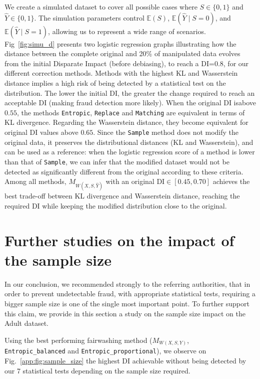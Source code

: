 \documentclass[runningheads, orivec]{llncs}
\begin{document}
 

We create a simulated dataset to cover all possible cases where $ S \in \{0,1\}$ and $\widehat{Y} \in \{0,1\}$. The simulation parameters control $ \mathbb{E}(S)$, $ \mathbb{E}(\widehat{Y} \mid S = 0)$, and $\mathbb{E}(\widehat{Y} \mid S = 1)$, allowing us to represent a wide range of scenarios.
Fig~\ref{fig:simu_d} presents two logistic regression graphs illustrating how the distance between the complete original and 20\% of manipulated data evolves from the initial Disparate Impact (before debiasing), to reach a DI=0.8, for our different correction methods.
Methods with the highest KL and Wasserstein distance implies a high risk of being detected by a statistical test on the distribution. The lower the initial DI, the greater the change required to reach an acceptable DI (making fraud detection more likely).
When the original DI isabove $0.55$, the methods \texttt{Entropic}, \texttt{Replace} and \texttt{Matching} are equivalent in terms of KL divergence. Regarding the Wasserstein distance, they become equivalent for original DI values above $0.65$. Since the \texttt{Sample} method does not modify the original data, it preserves the distributional distances (KL and Wasserstein), and can be used as a reference: when the logistic regression score of a method is lower than that of \texttt{Sample}, we can infer that the modified dataset would not be detected as significantly different from the original according to these criteria. Among all methods, $M_{W(X,S,\widehat{Y})}$ with an original DI$\in[0.45,0.70]$ achieves the best trade-off between KL divergence and Wasserstein distance, reaching the required DI while keeping the modified distribution close to the original.

\section{Further studies on the impact of the sample size}
\label{sec:futher_studies}
In our conclusion, we recommended strongly to the referring authorities, that in order to prevent undetectable fraud, with appropriate statistical tests, requiring a bigger sample size is one of the single most important point. To further support this claim, we provide in this section a study on the sample size impact on the Adult dataset.

Using the best performing fairwashing method ($M_{W(X,S,Y)}$, \\ \texttt{Entropic\_balanced} and \texttt{Entropic\_proportional}), we observe on Fig.~\ref{app:fig:sample_size} the highest DI achievable without being detected by our 7 statistical tests depending on the sample size required. 
\end{document}
